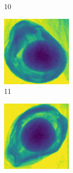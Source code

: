 \documentclass[11pt]{article}
\begin{document}
\begin{figure}[!h]
\begin{subfigure}[b]{0.22\textwidth}
         \caption{10}
         \label{fig:avo_9}
     \end{subfigure}
     \hfill
     \begin{subfigure}[b]{0.22\textwidth}
         \centering
         \includegraphics[width=\textwidth]{figurer/avocado_dataset/avo_10.jpg}
         \caption{11}
         \label{fig:avo_10}
     \end{subfigure}
     \hfill
     \begin{subfigure}[b]{0.22\textwidth}
         \centering
         \includegraphics[width=\textwidth]{figurer/avocado_dataset/avo_11.jpg}

\end{subfigure}
\end{figure}
\end{document}
